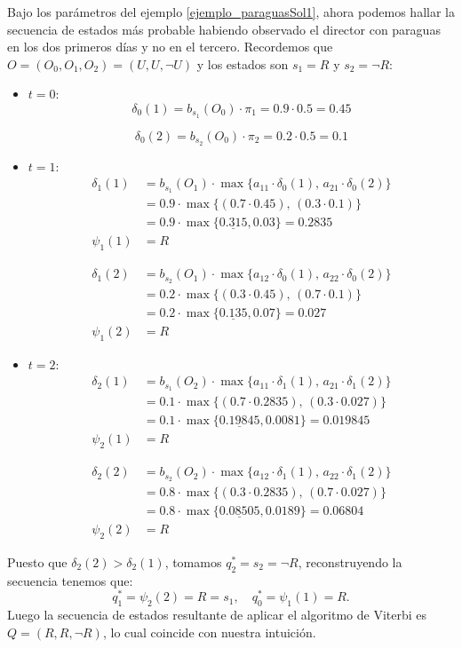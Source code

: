 \begin{exampleth}
Bajo los parámetros del ejemplo \ref{ejemplo_paraguasSol1}, ahora podemos hallar la secuencia de estados más probable habiendo observado el director con paraguas en los dos primeros días y no en el tercero. Recordemos que $O=(O_0,O_1,O_2)=(U,U,\neg U)$ y los estados son $s_1=R$ y $s_2=\neg R$:
\begin{itemize}
    \item $t=0$:
    \[\delta_0(1)=b_{s_1}(O_0)\cdot\pi_1=0.9\cdot0.5=0.45\]
    
    \[\delta_0(2)=b_{s_2}(O_0)\cdot\pi_2=0.2\cdot0.5=0.1\]
    
    \item $t=1$:
    \[\begin{aligned}
        \delta_1(1)&=b_{s_1}(O_1)\cdot\max\{a_{11}\cdot\delta_0(1),\,a_{21}\cdot\delta_0(2)\}\\
        &=0.9\cdot\max\{(0.7\cdot0.45),\,(0.3\cdot0.1)\}\\
        &=0.9\cdot\max\{\underline{0.315},0.03\}=0.2835\\
        \psi_1(1)&=R
    \end{aligned}\]
    
    \[\begin{aligned}
        \delta_1(2)&=b_{s_2}(O_1)\cdot\max\{a_{12}\cdot\delta_0(1),\,a_{22}\cdot\delta_0(2)\}\\
        &=0.2\cdot\max\{(0.3\cdot0.45),\,(0.7\cdot0.1)\}\\
        &=0.2\cdot\max\{\underline{0.135},0.07\}=0.027\\
        \psi_1(2)&=R
    \end{aligned}\]
    
    \item $t=2$:
    \[\begin{aligned}
        \delta_2(1)&=b_{s_1}(O_2)\cdot\max\{a_{11}\cdot\delta_1(1),\,a_{21}\cdot\delta_1(2)\}\\
        &=0.1\cdot\max\{(0.7\cdot0.2835),\,(0.3\cdot0.027)\}\\
        &=0.1\cdot\max\{\underline{0.19845},0.0081\}=0.019845\\
        \psi_2(1)&=R
    \end{aligned}\]
    
    \[\begin{aligned}
        \delta_2(2)&=b_{s_2}(O_2)\cdot\max\{a_{12}\cdot\delta_1(1),\,a_{22}\cdot\delta_1(2)\}\\
        &=0.8\cdot\max\{(0.3\cdot0.2835),\,(0.7\cdot0.027)\}\\
        &=0.8\cdot\max\{\underline{0.08505},0.0189\}=0.06804\\
        \psi_2(2)&=R
    \end{aligned}\]
\end{itemize}
Puesto que $\delta_2(2)>\delta_2(1)$, tomamos $q_2^*=s_2=\neg R$, reconstruyendo la secuencia tenemos que:
\[q_1^*=\psi_2(2)=R=s_1, \quad q_0^*=\psi_1(1)=R.\]
Luego la secuencia de estados resultante de aplicar el algoritmo de Viterbi es $Q=(R,R,\neg R)$, lo cual coincide con nuestra intuición.

\end{exampleth}


